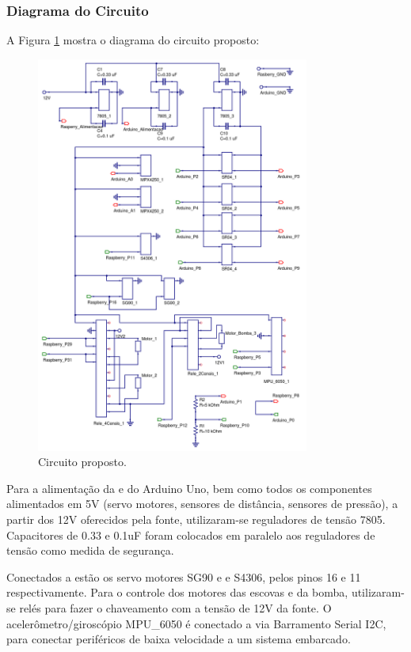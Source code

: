 \subsubsection{Diagrama do Circuito}
A Figura \ref{fig:circuit} mostra o diagrama do circuito proposto:
\par
\begin{figure}[h]
  \centering
  \includegraphics[width=0.8\textwidth]{figures/circuit.png}
  \caption{Circuito proposto.}
  \label{fig:circuit}
\end{figure}
\FloatBarrier
\par

Para a alimentação da  e do Arduino Uno, bem como todos os componentes alimentados em 5V (servo motores, sensores de distância, sensores de pressão), a partir dos 12V oferecidos pela fonte, utilizaram-se reguladores de tensão 7805. Capacitores de 0.33 e 0.1uF foram colocados em paralelo aos reguladores de tensão como medida de segurança.

Conectados a  estão os servo motores SG90 e e S4306, pelos pinos 16 e 11 respectivamente. Para o controle dos motores das escovas e da bomba, utilizaram-se relés para fazer o chaveamento com a tensão de 12V da fonte. O acelerômetro/giroscópio MPU\_6050 é conectado a \rasp via Barramento Serial I2C, para conectar periféricos de baixa velocidade a um sistema embarcado.

